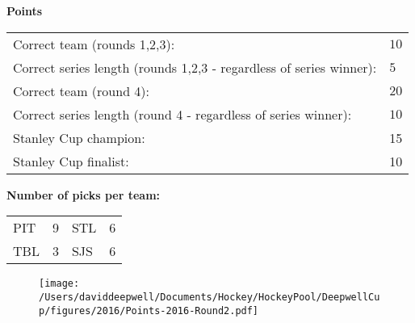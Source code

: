 \documentclass[10pt]{article}
\begin{document}
{\bf Points}\\
\begin{minipage}{12cm}
    \begin{tabular}{l l}
            Correct team (rounds 1,2,3):	& $10$\\
            Correct series length (rounds 1,2,3 - regardless of series winner):	& $5$\\
            Correct team (round 4):	& $20$\\
            Correct series length (round 4 - regardless of series winner):	& $10$\\
        Stanley Cup champion:	& 15\\
        Stanley Cup finalist:	& 10\\
    \end{tabular}

    \vspace{1cm}
    {\bf Number of picks per team:}\\
    \begin{tabular}{lc | lc }
        PIT & 9 & STL & 6 \\
        TBL & 3 & SJS & 6 \\
    \end{tabular}
\end{minipage}
\begin{minipage}[t]{13cm}
    \begin{figure}[H]
        \vspace{-2.5cm}
        \texttt{[image: /Users/daviddeepwell/Documents/Hockey/HockeyPool/DeepwellCup/figures/2016/Points-2016-Round2.pdf]}
    \end{figure}
\end{minipage}
\end{document}
